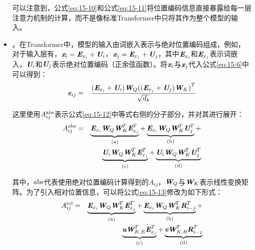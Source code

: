 \begin{itemize}
\noindent 可以注意到，公式\eqref{eq:15-10}和公式\eqref{eq:15-11}将位置编码信息直接暴露给每一层注意力机制的计算，而不是像标准Transformer中只将其作为整个模型的输入。

\vspace{0.5em}
\item {\small{}}。在Transformer中，模型的输入由词嵌入表示与绝对位置编码组成，例如，对于输入层有，$\textbf{\em x}_i = \textbf{\em E}_{x_i} + \textbf{\em U}_i$，$\textbf{\em x}_j=\textbf{\em E}_{x_j} + \textbf{\em U}_j$，其中$\textbf{\em E}_{x_i} $和$\textbf{\em E}_{x_j} $表示词嵌入，$\textbf{\em U}_i$和$\textbf{\em U}_j$表示绝对位置编码（正余弦函数）。将$\textbf{\em x}_i$与$\textbf{\em x}_j$代入公式\eqref{eq:15-6}中可以得到：
\begin{eqnarray}
\textbf{\em e}_{ij} &=& \frac{(\textbf{\em E}_{x_i} + \textbf{\em U}_i)\textbf{\em W}_Q{((\textbf{\em E}_{x_j} + \textbf{\em U}_j)\textbf{\em W}_K)}^{T}}{\sqrt{d_k}}
\label{eq:15-12}
\end{eqnarray}

\noindent 这里使用$A_{ij}^{\rm abs}$表示公式\eqref{eq:15-12}中等式右侧的分子部分，并对其进行展开：
\begin{eqnarray}
A_{ij}^{\rm abs} &=& \underbrace{\textbf{\em E}_{x_i}\textbf{\em W}_Q\textbf{\em W}_{K}^{T}\textbf{\em E}_{x_j}^{T}}_{\textrm{(a)}} + \underbrace{\textbf{\em E}_{x_i}\textbf{\em W}_Q\textbf{\em W}_{K}^{T}\textbf{\em U}_{j}^{T}}_{\textrm{(b)}} + \nonumber \\
& & \underbrace{\textbf{\em U}_i\textbf{\em W}_Q\textbf{\em W}_{K}^{T}\textbf{\em E}_{x_j}^{T}}_{\textrm{(c)}} + \underbrace{\textbf{\em U}_i\textbf{\em W}_Q\textbf{\em W}_{K}^{T}\textbf{\em U}_{j}^{T}}_{\textrm{(d)}}
\label{eq:15-13}
\end{eqnarray}

\noindent 其中，${\rm abs}$代表使用绝对位置编码计算得到的$A_{ij}$，$\textbf{\em W}_Q$与$\textbf{\em W}_K$表示线性变换矩阵。为了引入相对位置信息，可以将公式\eqref{eq:15-13}修改为如下形式：
\begin{eqnarray}
A_{ij}^{\rm rel} &=& \underbrace{\textbf{\em E}_{x_i}\textbf{\em W}_Q\textbf{\em W}_{K}^{T}\textbf{\em E}_{x_j}^{T}}_{\textrm{(a)}} + \underbrace{\textbf{\em E}_{x_i}\textbf{\em W}_Q\textbf{\em W}_{K}^{T}\textbf{\em R}_{i-j}^{T}}_{\textrm{(b)}} + \nonumber \\
& & \underbrace{\textbf{\em u}\textbf{\em W}_{K,E}^{T}\textbf{\em E}_{x_j}^{T}}_{\textrm{(c)}} + \underbrace{\textbf{\em v}\textbf{\em W}_{K,R}^{T}\textbf{\em R}_{i-j}^{T}}_{\textrm{(d)}}
\label{eq:15-14}
\end{eqnarray}


\end{itemize}
